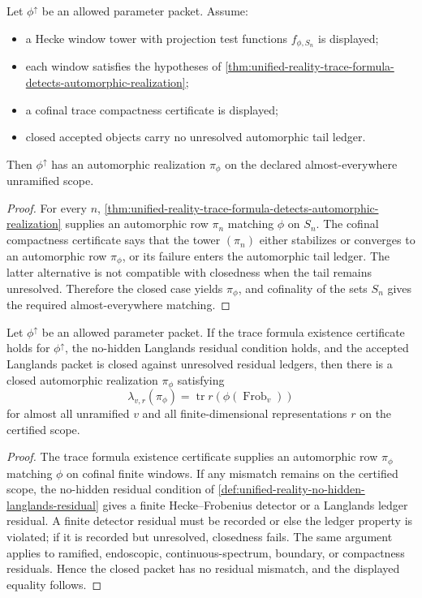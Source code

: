 \begin{theorem}
\label{thm:unified-reality-trace-formula-existence-certificate}
Let $\phi^{\uparrow}$ be an allowed parameter packet. Assume:
\begin{itemize}
\item a Hecke window tower with projection test functions
$f_{\phi,S_n}$ is displayed;
\item each window satisfies the hypotheses of
\autoref{thm:unified-reality-trace-formula-detects-automorphic-realization};
\item a cofinal trace compactness certificate is displayed;
\item closed accepted objects carry no unresolved automorphic tail
ledger.
\end{itemize}
Then $\phi^{\uparrow}$ has an automorphic realization
$\pi_{\phi}$ on the declared almost-everywhere unramified scope.
\end{theorem}
\begin{proof}
For every $n$,
\autoref{thm:unified-reality-trace-formula-detects-automorphic-realization}
supplies an automorphic row $\pi_n$ matching $\phi$ on $S_n$. The
cofinal compactness certificate says that the tower $(\pi_n)$ either
stabilizes or converges to an automorphic row $\pi_{\phi}$, or its
failure enters the automorphic tail ledger. The latter alternative is
not compatible with closedness when the tail remains unresolved.
Therefore the closed case yields $\pi_{\phi}$, and cofinality of the
sets $S_n$ gives the required almost-everywhere matching.
\end{proof}

\begin{theorem}
\label{thm:unified-reality-bedc-reciprocity-existence}
Let $\phi^{\uparrow}$ be an allowed parameter packet. If the trace
formula existence certificate holds for $\phi^{\uparrow}$, the
no-hidden Langlands residual condition holds, and the accepted
Langlands packet is closed against unresolved residual ledgers, then
there is a closed automorphic realization $\pi_{\phi}$ satisfying
$$
\lambda_{v,r}(\pi_{\phi})
=
\operatorname{tr}r(\phi(\operatorname{Frob}_v))
$$
for almost all unramified $v$ and all finite-dimensional
representations $r$ on the certified scope.
\end{theorem}
\begin{proof}
The trace formula existence certificate supplies an automorphic row
$\pi_{\phi}$ matching $\phi$ on cofinal finite windows. If any mismatch
remains on the certified scope, the no-hidden residual condition of
\autoref{def:unified-reality-no-hidden-langlands-residual} gives a
finite Hecke--Frobenius detector or a Langlands ledger residual. A
finite detector residual must be recorded or else the ledger property is
violated; if it is recorded but unresolved, closedness fails. The same
argument applies to ramified, endoscopic, continuous-spectrum, boundary,
or compactness residuals. Hence the closed packet has no residual
mismatch, and the displayed equality follows.
\end{proof}

